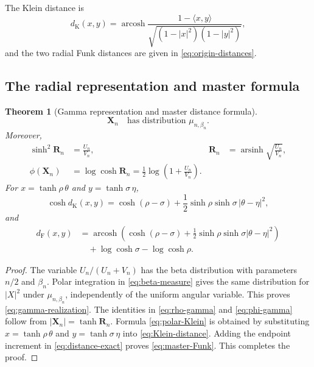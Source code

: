 \documentclass{amsart}
\numberwithin{equation}{section}
\theoremstyle{plain}
\newtheorem{theorem}{Theorem}[section]
\theoremstyle{definition}
\theoremstyle{remark}
\DeclareMathOperator{\arcosh}{arcosh}
\DeclareMathOperator{\arsinh}{arsinh}
\newcommand{\dF}{d_{\mathrm F}}
\newcommand{\dK}{d_{\mathrm K}}
\begin{document}
The Klein distance is
\begin{equation}\label{eq:Klein-distance} \dK(x,y)=\arcosh\frac{1-\langle x,y\rangle}{\sqrt{(1-|x|^2)(1-|y|^2)}}, \end{equation}
and the two radial Funk distances are given in \eqref{eq:origin-distances}.

\subsection{The radial representation and master formula}

\begin{theorem}[Gamma representation and master distance formula]\label{thm:gamma-master}
\begin{equation}\label{eq:gamma-realization} \mathbf X_n\quad\text{has distribution }\mu_{n,\beta_n}. \end{equation}
Moreover,
\begin{align}
 \sinh^2\mathbf R_n&=\frac{U_n}{V_n},
 &\mathbf R_n&=\arsinh\sqrt{\frac{U_n}{V_n}},
 \label{eq:rho-gamma}\\
 \phi(\mathbf X_n)&=\log\cosh\mathbf R_n
 =\frac12\log\left(1+\frac{U_n}{V_n}\right).
 \label{eq:phi-gamma}
\end{align}
For $x=\tanh\rho\,\theta$ and $y=\tanh\sigma\,\eta$,
\begin{equation}\label{eq:polar-Klein} \cosh\dK(x,y) =\cosh(\rho-\sigma) +\frac12\sinh\rho\sinh\sigma\,|\theta-\eta|^2, \end{equation}
and
\begin{equation}\label{eq:master-Funk}
 \begin{split}
\dF(x,y) &=\arcosh\left( \cosh(\rho-\sigma) +\frac12\sinh\rho\sinh\sigma|\theta-\eta|^2 \right)\\
 &\quad+\log\cosh\sigma-\log\cosh\rho.
 \end{split}
\end{equation}
\end{theorem}

\begin{proof}
The variable $U_n/(U_n+V_n)$ has the beta distribution with parameters $n/2$ and $\beta_n$.  Polar integration in \eqref{eq:beta-measure} gives the same distribution for $|X|^2$ under $\mu_{n,\beta_n}$, independently of the uniform angular variable.  This proves \eqref{eq:gamma-realization}.  The identities in \eqref{eq:rho-gamma} and \eqref{eq:phi-gamma} follow from $|\mathbf X_n|=\tanh\mathbf R_n$.  Formula \eqref{eq:polar-Klein} is obtained by substituting $x=\tanh\rho\,\theta$ and $y=\tanh\sigma\,\eta$ into \eqref{eq:Klein-distance}.  Adding the endpoint increment in \eqref{eq:distance-exact} proves \eqref{eq:master-Funk}.
This completes the proof.
\end{proof}
\end{document}
